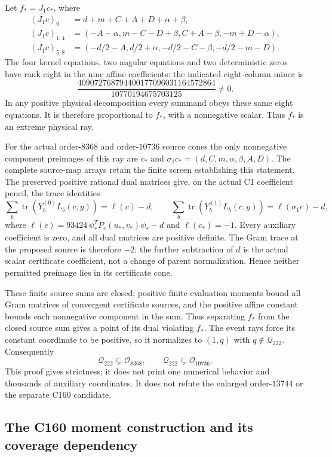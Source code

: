 \documentclass[11pt]{article}
\newcommand{\Q}{\mathcal Q_{222}}
\begin{document}
Let $f_*=J_1c_*$, where
\[
 \begin{aligned}
 (J_1c)_0&=d+m+C+A+D+\alpha+\beta,\\
 (J_1c)_{1:4}&=(-A-\alpha,m-C-D+\beta,C+A-\beta,-m+D-\alpha),\\
 (J_1c)_{5:8}&=(-d/2-A,d/2+\alpha,-d/2-C-\beta,-d/2-m-D).
 \end{aligned}
\]
The four kernel equations, two angular equations and two deterministic
zeros have rank eight in the nine affine coefficients: the indicated
eight-column minor is
\[
 \frac{409072768794400177096031164572864}{10770194675703125}\ne0.
\]
In any positive physical decomposition every summand obeys these same
eight equations. It is therefore proportional to $f_*$, with a
nonnegative scalar. Thus $f_*$ is an extreme physical ray.

For the actual order-$8368$ and order-$10736$ source cones the only
nonnegative component preimages of this ray are $c_*$ and
$\sigma_1c_*=(d,C,m,\alpha,\beta,A,D)$. The complete source-map
arrays retain the finite screen establishing this statement. The
preserved positive rational dual matrices give, on the actual C1
coefficient pencil, the trace identities
\[
 \sum_b\operatorname{tr}(Y_b^{(0)}L_b(c,y))=\ell(c)-d,\qquad
 \sum_b\operatorname{tr}(Y_b^{(1)}L_b(c,y))=\ell(\sigma_1c)-d,
\]
where $\ell(c)=93424\,\psi_*^TP_c(u_*,v_*)\psi_*-d$ and
$\ell(c_*)=-1$. Every auxiliary coefficient is zero, and all dual
matrices are positive definite. The Gram trace at the proposed source
is therefore $-2$: the further subtraction of $d$ is the actual scalar
certificate coefficient, not a change of parent normalization. Hence
neither permitted preimage lies in its certificate cone.

These finite source sums are closed: positive finite evaluation moments
bound all Gram matrices of convergent certificate sources, and the
positive affine constant bounds each nonnegative component in the sum.
Thus separating $f_*$ from the closed source sum gives a point of its
dual violating $f_*$. The event rays force its constant coordinate to
be positive, so it normalizes to $(1,q)$ with $q\notin\Q$.
Consequently
\[
 \Q\subsetneq\mathcal O_{8368},\qquad
 \Q\subsetneq\mathcal O_{10736}.
\]
This proof gives strictness; it does not print one numerical behavior
and thousands of auxiliary coordinates. It does not refute the enlarged
order-$13744$ or the separate C160 candidate.

\subsection{The C160 moment construction and its coverage dependency}
\end{document}
